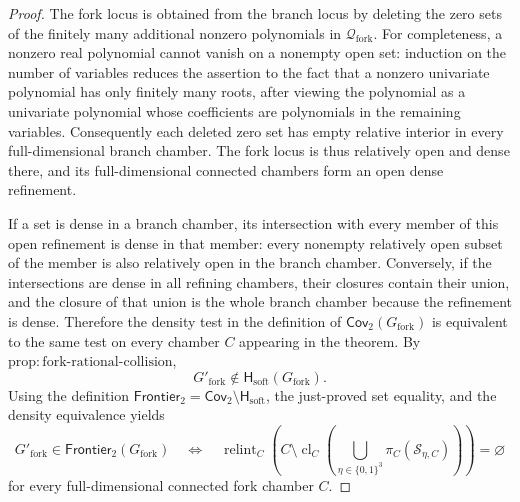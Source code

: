 \documentclass{article}
\begin{document}
\begin{proof}
The fork locus is obtained from the branch locus by deleting the zero sets
of the finitely many additional nonzero polynomials in
\(\mathcal Q_{\mathrm{fork}}\).  For completeness, a nonzero real polynomial
cannot vanish on a nonempty open set: induction on the number of variables
reduces the assertion to the fact that a nonzero univariate polynomial has
only finitely many roots, after viewing the polynomial as a univariate
polynomial whose coefficients are polynomials in the remaining variables.
Consequently each deleted zero set has empty relative interior in every
full-dimensional branch chamber.  The fork locus is thus relatively open
and dense there, and its full-dimensional connected chambers form an open
dense refinement.

If a set is dense in a branch chamber, its intersection with every member
of this open refinement is dense in that member: every nonempty relatively
open subset of the member is also relatively open in the branch chamber.
Conversely, if the intersections are dense in all refining chambers, their
closures contain their union, and the closure of that union is the whole
branch chamber because the refinement is dense.  Therefore the density test
in the definition of \(\mathsf{Cov}_2(G_{\mathrm{fork}})\) is equivalent to
the same test on every chamber \(C\) appearing in the theorem.  By
\(\mathrm{prop:fork\text{-}rational\text{-}collision}\),
\[
 G'_{\mathrm{fork}}\notin
 \mathsf H_{\mathrm{soft}}(G_{\mathrm{fork}}).
\]
Using the definition
\(\mathsf{Frontier}_2=\mathsf{Cov}_2\setminus\mathsf H_{\mathrm{soft}}\),
the just-proved set equality, and the density equivalence yields
\[
 G'_{\mathrm{fork}}\in\mathsf{Frontier}_2(G_{\mathrm{fork}})
 \quad\Longleftrightarrow\quad
 \operatorname{relint}_C\!\left(
 C\setminus\operatorname{cl}_C
 \left(\bigcup_{\eta\in\{0,1\}^3}
 \pi_C(\mathscr S_{\eta,C})\right)
 \right)=\varnothing
\]
for every full-dimensional connected fork chamber \(C\).


\end{proof}
\end{document}
